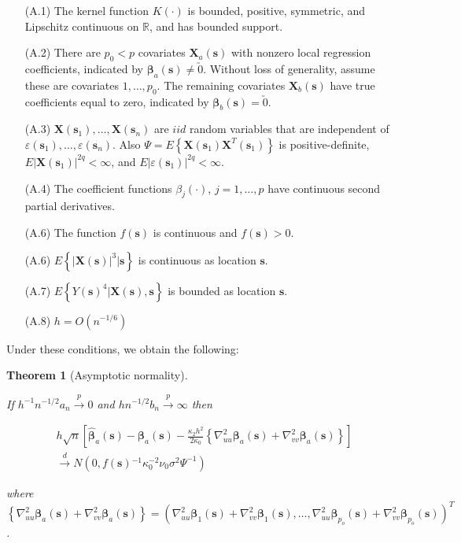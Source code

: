 \documentclass[authoryear,review, 12pt]{elsarticle}
\newtheorem{thm}{Theorem}
\begin{document}
\begin{itemize}
\item[(A.1)] The kernel function $K\left(\cdot\right)$ is bounded, positive,
symmetric, and Lipschitz continuous on $\mathbb{R}$, and has bounded
support.
\item[(A.2)] There are $p_{0}<p$ covariates $\bm{X}_{a}\left(\bm{s}\right)$
with nonzero local regression coefficients, indicated by $\bm{\beta}_{a}(\bm{s})\ne\utilde{0}$.
Without loss of generality, assume these are covariates $1,\dots,p_{0}$.
The remaining covariates $\bm{X}_{b}\left(\bm{s}\right)$ have true
coefficients equal to zero, indicated by $\bm{\beta}_{b}\left(\bm{s}\right)=\utilde{0}$.
\item[(A.3)] $\bm{X}\left(\bm{s}_{1}\right),\dots,\bm{X}\left(\bm{s}_{n}\right)$
are $iid$ random variables that are independent of $\varepsilon\left(\bm{s}_{1}\right),\dots,\varepsilon\left(\bm{s}_{n}\right)$.
Also $\Psi=E\left\{ \bm{X}\left(\bm{s}_{1}\right)\bm{X}^{T}\left(\bm{s}_{1}\right)\right\} $
is positive-definite, $E\left|\bm{X}\left(\bm{s}_{1}\right)\right|^{2q}<\infty$,
and $E\left|\varepsilon\left(\bm{s}_{1}\right)\right|^{2q}<\infty$.
\item[(A.4)] The coefficient functions $ $$\beta_{j}\left(\cdot\right)$, $j=1,\dots,p$
have continuous second partial derivatives.
\item[(A.6)] The function $f\left(\bm{s}\right)$ is continuous and $f\left(\bm{s}\right)>0$.
\item[(A.6)] $E\left\{ \left|\bm{X}\left(\bm{s}\right)\right|^{3}|\bm{s}\right\} $
is continuous as location $\bm{s}$.
\item[(A.7)] $E\left\{ Y\left(\bm{s}\right)^{4}|\bm{X}\left(\bm{s}\right),\bm{s}\right\} $
is bounded as location $\bm{s}$.
\item[(A.8)] $h=O\left(n^{-1/6}\right)$
\end{itemize}
Under these conditions, we obtain the following:
\begin{thm}[Asymptotic normality]
\label{theorem:normality} 



If $h^{-1}n^{-1/2}a_{n}\xrightarrow{p}0$ and $hn^{-1/2}b_{n}\xrightarrow{p}\infty$
then

\begin{multline*}
h\sqrt{n}\left[\hat{\bm{\beta}}_{a}\left(\bm{s}\right)-\bm{\beta}_{a}\left(\bm{s}\right)-\frac{\kappa_{2}h^{2}}{2\kappa_{0}}\left\{ \nabla_{uu}^{2}\bm{\beta}_{a}\left(\bm{s}\right)+\nabla_{vv}^{2}\bm{\beta}_{a}\left(\bm{s}\right)\right\} \right]\\
\xrightarrow{d}N\left(0,f\left(\bm{s}\right){}^{-1}\kappa_{0}^{-2}\nu_{0}\sigma^{2}\Psi^{-1}\right)
\end{multline*}


where $\left\{ \nabla_{uu}^{2}\bm{\beta}_{a}\left(\bm{s}\right)+\nabla_{vv}^{2}\bm{\beta}_{a}\left(\bm{s}\right)\right\} =\left(\nabla_{uu}^{2}\bm{\beta}_{1}\left(\bm{s}\right)+\nabla_{vv}^{2}\bm{\beta}_{1}\left(\bm{s}\right),\dots,\nabla_{uu}^{2}\bm{\beta}_{p_{o}}\left(\bm{s}\right)+\nabla_{vv}^{2}\bm{\beta}_{p_{o}}\left(\bm{s}\right)\right)^{T}$.
\end{thm}
\end{document}
